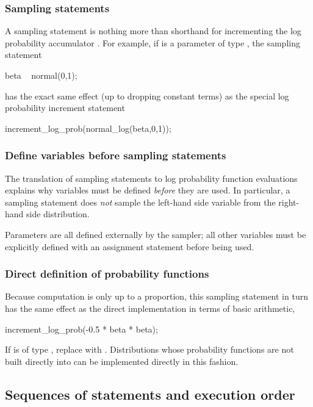 \documentclass[article]{jss}
\begin{document}
\subsubsection{Sampling statements}

A sampling statement is nothing more than shorthand for incrementing
the log probability accumulator .  For example, if
 is a parameter of type , the sampling statement
%
\begin{Code}
beta ~ normal(0,1);
\end{Code}
%
has the exact same effect (up to dropping constant terms) as the
special log probability increment statement
%
\begin{Code}
increment_log_prob(normal_log(beta,0,1));
\end{Code}


\subsubsection{Define variables before sampling statements}

The translation of sampling statements to log probability function
evaluations explains why variables must be defined {\it before} they
are used.  In particular, a sampling statement does \emph{not} sample
the left-hand side variable from the right-hand side distribution.

Parameters are all defined externally by the sampler; all other
variables must be explicitly defined with an assignment statement
before being used.


\subsubsection{Direct definition of probability functions}

Because computation is only up to a proportion, this sampling
statement in turn has the same effect as the direct implementation in
terms of basic arithmetic,
%
\begin{Code}
increment_log_prob(-0.5 * beta * beta);
\end{Code}
%
If  is of type , replace 
with .  Distributions whose probability functions
are not built directly into  can be implemented
directly in this fashion.



\subsection{Sequences of statements and execution order}
\end{document}
